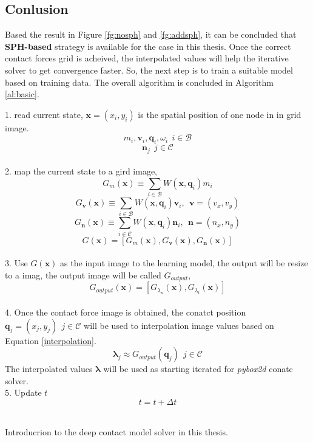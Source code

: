 \subsection{Conlusion}
    Based the result in Figure \ref{fg:nosph} and \ref{fg:addsph}, it can be concluded that \textbf{SPH-based} strategy is available for the case in this thesis. Once the correct contact forces grid is acheived, the interpolated values will help the iterative solver to get convergence faster. So, the next step is to train a suitable model based on training data. The overall algorithm is concluded in Algorithm \ref{al:basic}.
    \begin{algorithm}[!h]
        {
            1. read current state, $\mathbf{x}=(x_i, y_i)$ is the spatial position of one node in in grid image.
                $$m_i, \pmb{v}_i, \pmb{q}_i, \omega_{i}~~i\in\mathcal{B}$$
                $$\pmb{n}_j~~j\in\mathcal{C}$$ \\
            2. map the current state to a gird image,
                $$G_{m}(\mathbf{x}) \equiv \sum_{i\in \mathcal{B}}W(\mathbf{x}, \pmb{q}_{i})m_i$$ 
                $$G_{\pmb{v}}(\mathbf{x}) \equiv \sum_{i\in \mathcal{B}}W(\mathbf{x}, \pmb{q}_{i})\pmb{v}_i,~~\pmb{v}=(v_x, v_y)$$
                $$G_{\pmb{n}}(\mathbf{x}) \equiv \sum_{i\in\mathcal{C}}W(\mathbf{x}, \pmb{q}_{i})\pmb{n}_{i},~~\pmb{n}=(n_x,n_y)$$
                $$G(\mathbf{x}) = [G_{m}(\mathbf{x}), G_{\pmb{v}}(\mathbf{x}), G_{\pmb{n}}(\mathbf{x})]$$ \\
            3. Use $G(\mathbf{x})$ as the input image to the learning model, the output will be resize to a imag, the output image will be called $G_{output}$,
                $$G_{output}(\mathbf{x}) = [G_{\lambda_{n}}(\mathbf{x}), G_{{\lambda}_{t}}(\mathbf{x})]$$ \\
            4. Once the contact force image is obtained,  the conatct position $\pmb{q}_{j} = (x_{j}, y_{j})~~j\in\mathcal{C}$  will be used to interpolation image values based on Equation \ref{interpolation}.
                $$\pmb{\lambda}_j \approx G_{output}(\pmb{q}_j)~~j\in\mathcal{C}$$ 
            The interpolated values $\pmb{\lambda}$ will be used as starting iterated for \textit{pybox2d} conatc solver. \\
            5. Update $t$
                $$t = t + \Delta t$$ \\
        }
        \caption{Introducrion to the deep contact model solver in this thesis.}
        \label{al:basic}
    \end{algorithm}


